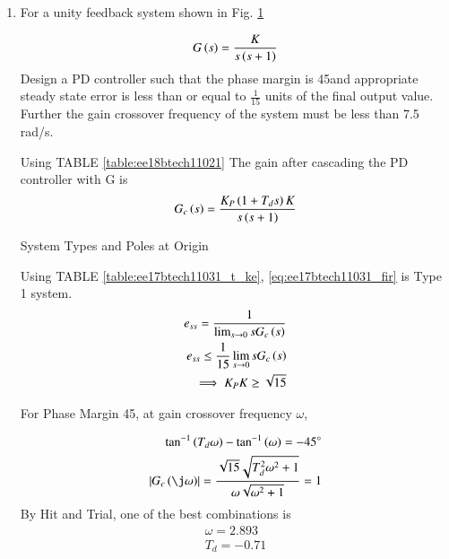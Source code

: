 \begin{enumerate}[label=\thesection.\arabic*.,ref=\thesection.\theenumi]
\item For a unity feedback system shown in Fig. \ref{fig:ee17btech11031_tiklap_ke}
\begin{figure}[!ht]
    \centering
	\resizebox{\columnwidth}{!}{}
    \caption{}
    \label{fig:ee17btech11031_tiklap_ke}
\end{figure}
\begin{align}
    G\brak{s} = \frac{K}{s\brak{s+1}}
    \label{eq:ee17btech11031_system1}
\end{align}
Design a PD controller such that the phase margin is 45\degree and appropriate steady state error is less than or equal to $\frac{1}{15}$ units of the final output value. Further the gain crossover frequency of the system must be less than 7.5 rad/s.

\solution Using TABLE \ref{table:ee18btech11021}
The gain after cascading the PD controller with G is
\begin{align}
    G_{c}\brak{s} = \frac{K_{P}\brak{1 + T_{d}s}K}{s\brak{s+1}}
    \label{eq:ee17btech11031_fir}
\end{align}

\begin{table}[!ht]
    \centering
    
    \caption{System Types and Poles at Origin}
    \label{table:ee17btech11031_t_ke}
\end{table}


Using TABLE \ref{table:ee17btech11031_t_ke}, \eqref{eq:ee17btech11031_fir} is Type 1 system.
\begin{align}
    e_{ss} = \frac{1}{\lim_{s \to 0} sG_{c}\left(s\right)}\\
    e_{ss} \leq \frac{1}{15} \lim_{s \to 0} sG_{c}\left(s\right)\\
    \implies K_{P}K \geq \sqrt{15}
\end{align}

For Phase Margin 45\degree, at gain crossover frequency $\omega$,

\begin{align}
    \tan^{-1}\brak{T_{d}\omega} - \tan^{-1}\brak{\omega} = -45 \degree\\
    \abs{G_{c}\brak{\j\omega}} = \frac{\sqrt{15}\sqrt{T_{d}^2\omega^2 + 1}}{\omega\sqrt{\omega^2+1}} = 1
\end{align}
By Hit and Trial, one of the best combinations is
\begin{align}
    \omega = 2.893\\
    T_{d} = -0.71
\end{align}


\end{enumerate}
